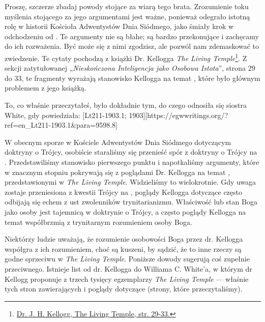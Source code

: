 Proszę, szczerze zbadaj powody stojące za wiarą tego brata. Zrozumienie toku myślenia stojącego za jego argumentami jest ważne, ponieważ odegrało istotną rolę w historii Kościoła Adwentystów Dnia Siódmego, jako śmiały krok w odchodzeniu od . Te argumenty nie są błahe; są bardzo przekonujące i zachęcamy do ich rozważenia. Być może się z nimi zgodzisz, ale pozwól nam zdemaskować to zwiedzenie. Te cytaty pochodzą z książki Dr. Kellogga \textit{The Living Temple}\footnote{\href{https://archive.org/details/J.H.Kellogg.TheLivingTemple1903}{Dr. J. H. Kellogg, The Living Temple, str. 29-33.}}. Z sekcji zatytułowanej „\textit{Nieskończona Inteligencja jako Osobowa Istota}”, strona 29 do 33, te fragmenty wyrażają stanowisko Kellogga na temat , które było głównym problemem z jego książką.

To, co właśnie przeczytałeś, było dokładnie tym, do czego odnosiła się siostra White, gdy powiedziała: [Lt211-1903.1; 1903][https://egwwritings.org/?ref=en\_Lt211-1903.1&para=9598.8]

W obecnym sporze w Kościele Adwentystów Dnia Siódmego dotyczącym doktryny o Trójcy, osobiście staraliśmy się przenieść spór z doktryny o Trójcy na . Przedstawiliśmy stanowisko pierwszego punktu  i napotkaliśmy argumenty, które w znacznym stopniu pokrywają się z poglądami Dr. Kellogga na temat , przedstawionymi w \textit{The Living Temple}. Widzieliśmy to wielokrotnie. Gdy uwaga zostaje przeniesiona z kwestii Trójcy na , poglądy Kellogga dotyczące  często odbijają się echem z ust zwolenników trynitarianizmu. Właściwość lub stan Boga jako osoby jest tajemnicą w doktrynie o Trójcy, a często poglądy Kellogga na temat  współbrzmią z trynitarnym rozumieniem osoby Boga.

Niektórzy ludzie uważają, że rozumienie osobowości Boga przez dr. Kellogga współgra z ich rozumieniem, choć są kuszeni, by sądzić, że to inne rzeczy są godne sprzeciwu w \textit{The Living Temple}. Poniższe dowody sugerują coś zupełnie przeciwnego. Istnieje list od dr. Kellogga do Williama C. White’a, w którym dr Kellogg proponuje  z trzech tysięcy egzemplarzy \textit{The Living Temple} — właśnie tych stron zawierających  i poglądy dotyczące  (strony, które przeczytaliśmy).

